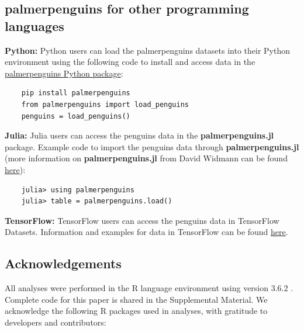 \hypertarget{palmerpenguins-for-other-programming-languages}{%
\subsection{palmerpenguins for other programming
languages}\label{palmerpenguins-for-other-programming-languages}}

\textbf{Python:} Python users can load the palmerpenguins datasets into
their Python environment using the following code to install and access
data in the
\href{https://pypi.org/project/palmerpenguins/}{palmerpenguins Python
package}:

\begin{verbatim}
    pip install palmerpenguins
    from palmerpenguins import load_penguins
    penguins = load_penguins()
\end{verbatim}

\textbf{Julia:} Julia users can access the penguins data in the
\textbf{palmerpenguins.jl} package. Example code to import the penguins
data through \textbf{palmerpenguins.jl} (more information on
\textbf{palmerpenguins.jl} from David Widmann can be found
\href{https://github.com/devmotion/palmerpenguins.jl}{here}):

\begin{verbatim}
    julia> using palmerpenguins
    julia> table = palmerpenguins.load()
\end{verbatim}

\textbf{TensorFlow:} TensorFlow users can access the penguins data in
TensorFlow Datasets. Information and examples for  data
in TensorFlow can be found
\href{https://www.tensorflow.org/datasets/catalog/penguins}{here}.

\hypertarget{acknowledgements}{%
\subsection{Acknowledgements}\label{acknowledgements}}

All analyses were performed in the R language environment using version
3.6.2 \citep{r_core_team_r_2019}. Complete code for this paper is shared
in the Supplemental Material. We acknowledge the following R packages
used in analyses, with gratitude to developers and contributors:


